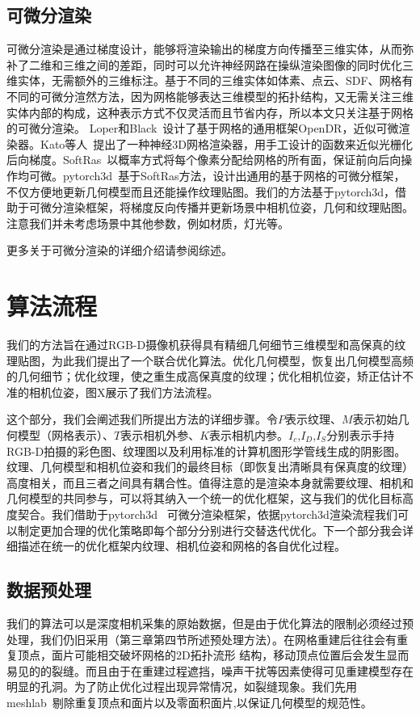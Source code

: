 \subsection{可微分渲染}
可微分渲染是通过梯度设计，能够将渲染输出的梯度方向传播至三维实体，从而弥补了二维和三维之间的差距，同时可以允许神经网路在操纵渲染图像的同时优化三维实体，无需额外的三维标注。基于不同的三维实体如体素、点云、SDF、网格有不同的可微分渲然方法，因为网格能够表达三维模型的拓扑结构，又无需关注三维实体内部的构成，这种表示方式不仅灵活而且节省内存，所以本文只关注基于网格的可微分渲染。
Loper和Black~\cite{MatthewLoper2014OpenDRAA}设计了基于网格的通用框架OpenDR，近似可微渲染器。Kato等人~\cite{MatthiasNiener2013Realtime3R}提出了一种神经3D网格渲染器，用手工设计的函数来近似光栅化后向梯度。SoftRas~\cite{ShichenLiu2019SoftRA}以概率方式将每个像素分配给网格的所有面，保证前向后向操作均可微。pytorch3d~\cite{ravi2020pytorch3d}基于SoftRas方法，设计出通用的基于网格的可微分框架，不仅方便地更新几何模型而且还能操作纹理贴图。我们的方法基于pytorch3d，借助于可微分渲染框架，将梯度反向传播并更新场景中相机位姿，几何和纹理贴图。注意我们并未考虑场景中其他参数，例如材质，灯光等。\par
更多关于可微分渲染的详细介绍请参阅综述\cite{HiroharuKato2020DifferentiableRA}。

\section{算法流程}

我们的方法旨在通过RGB-D摄像机获得具有精细几何细节三维模型和高保真的纹理贴图，为此我们提出了一个联合优化算法。优化几何模型，恢复出几何模型高频的几何细节；优化纹理，使之重生成高保真度的纹理；优化相机位姿，矫正估计不准的相机位姿，图X展示了我们方法流程。\par
这个部分，我们会阐述我们所提出方法的详细步骤。令$P$表示纹理、$M$表示初始几何模型（网格表示）、$T$表示相机外参、$K$表示相机内参。$I_c$,$I_D$,$I_S$分别表示手持RGB-D拍摄的彩色图、纹理图以及利用标准的计算机图形学管线生成的阴影图。纹理、几何模型和相机位姿和我们的最终目标（即恢复出清晰具有保真度的纹理）高度相关，而且三者之间具有耦合性。值得注意的是渲染本身就需要纹理、相机和几何模型的共同参与，可以将其纳入一个统一的优化框架，这与我们的优化目标高度契合。我们借助于pytorch3d ~\cite{ravi2020pytorch3d}可微分渲染框架，依据pytorch3d渲染流程我们可以制定更加合理的优化策略即每个部分分别进行交替迭代优化。下一个部分我会详细描述在统一的优化框架内纹理、相机位姿和网格的各自优化过程。\par
\subsection{数据预处理}
我们的算法可以是深度相机采集的原始数据，但是由于优化算法的限制必须经过预处理，我们仍旧采用（第三章第四节所述预处理方法）。在网格重建后往往会有重复顶点，面片可能相交破坏网格的2D拓扑流形
结构，移动顶点位置后会发生显而易见的的裂缝。而且由于在重建过程遮挡，噪声干扰等因素使得可见重建模型存在明显的孔洞。为了防止优化过程出现异常情况，如裂缝现象。我们先用meshlab~\cite{LocalChapterEvents:ItalChap:ItalianChapConf2008:129-136}剔除重复顶点和面片以及零面积面片,以保证几何模型的规范性。

